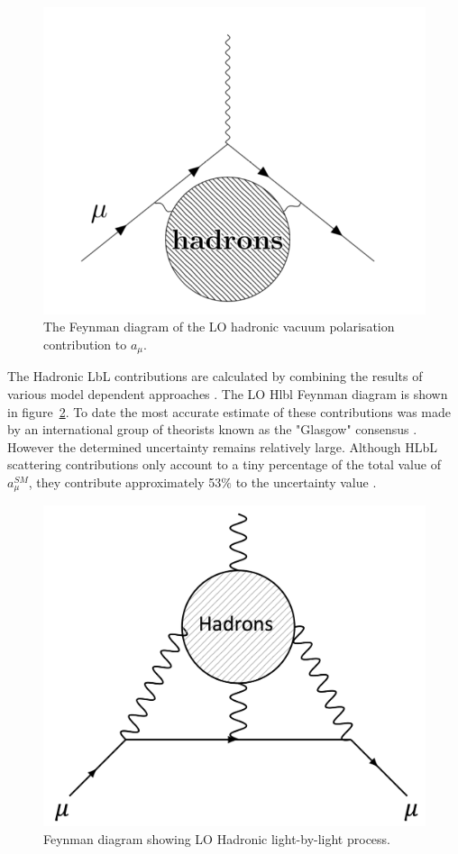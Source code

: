 \begin{figure}[th]
\centering
\includegraphics[scale=0.7]{Figures/HadHVP}
\decoRule
\caption{The Feynman diagram of the LO hadronic vacuum polarisation contribution to $a_{\mu}$.}
\label{fig:HadHVP}
\end{figure}

The Hadronic LbL contributions are calculated by combining the results of various model dependent approaches \cite{Reference23}. The LO Hlbl Feynman diagram is shown in figure~\ref{fig:hadroniclbl}. To date the most accurate estimate of these contributions was made by an international group of theorists known as the "Glasgow" consensus \cite{Reference24}. However the determined uncertainty remains relatively large. Although HLbL scattering contributions only account to a tiny percentage of the total value of $a_{\mu}^{SM}$, they contribute approximately 53$\%$ to the uncertainty value \cite{Reference25}.

\begin{figure}[th]
\centering
\includegraphics[scale=0.4]{Figures/hadroniclbl.png}
\decoRule
\caption{Feynman diagram showing  LO Hadronic light-by-light process.}
\label{fig:hadroniclbl}
\end{figure}


